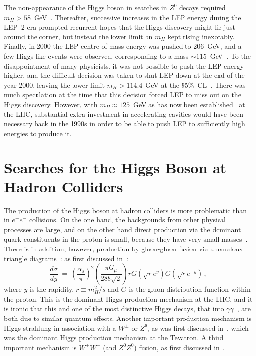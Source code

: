 \documentclass[12pt]{article}
\newcommand{\beq}{\begin{equation}}
\newcommand{\eeq}{\end{equation}}
\numberwithin{equation}{section}
\begin{document}
The non-appearance of the Higgs boson in searches in $Z^0$ decays
required $m_H > 58$~GeV~\cite{LEP1}.  Thereafter, successive increases
in the LEP energy during the LEP~2 era prompted recurrent hopes that
the Higgs discovery might lie just around the corner, but instead the
lower limit on $m_H$ kept rising inexorably. Finally, in 2000 the LEP
centre-of-mass energy was pushed to 206~GeV, and a few Higgs-like
events were observed, corresponding to a mass $\sim
115$~GeV~\cite{115}. To the disappointment of many physicists, it was
not possible to push the LEP energy higher, and the difficult decision
was taken to shut LEP down at the end of the year 2000, leaving the
lower limit $m_H > 114.4$~GeV at the 95\%~CL~\cite{LEPH}. There was
much speculation at the time that this decision forced LEP to miss out
on the Higgs discovery. However, with $m_H \approx 125$~GeV as has now
been established~\cite{July4} at the LHC, substantial extra
investment in accelerating cavities would have been necessary back in
the 1990s in order to be able to push LEP to sufficiently high
energies to produce it.

\section{Searches for the Higgs Boson at Hadron Colliders}

The production of the Higgs boson at hadron colliders is more problematic than
in $e^+ e^-$ collisions. On the one hand, the backgrounds from other physical processes are large,
and on the other hand direct production via the dominant quark constituents in
the proton is small, because they have very small masses~\cite{EGN}. There is in addition, 
however, production by gluon-gluon fusion via anomalous triangle diagrams~\cite{RU}:
as first discussed in~\cite{GGMN}:
\beq
\frac{d \sigma}{d y} \; =  \; \left(\frac{\alpha_s}{\pi}\right)^2 \left(\frac{\pi G_\mu}{288 \sqrt{2}}\right) r G(\sqrt{r} e^y) G(\sqrt{r} e^{-y}) \, ,
\label{GGMN}
\eeq
where $y$ is the rapidity, $r \equiv m_H^2/s$ and $G$ is the gluon distribution function within the proton.
This is the dominant Higgs production mechanism at the LHC, and it is ironic that this and
one of the most distinctive Higgs decays, that into $\gamma \gamma$~\cite{EGN}, are both due to
similar quantum effects.
Another important production mechanism is Higgs-strahlung in association with a $W^\pm$ or $Z^0$, 
as was first discussed in~\cite{GNY}, which was the dominant Higgs production mechanism at the Tevatron.
A third important mechanism is $W^+ W^-$ (and $Z^0 Z^0$)
fusion, as first discussed in~\cite{CD}.
\end{document}
